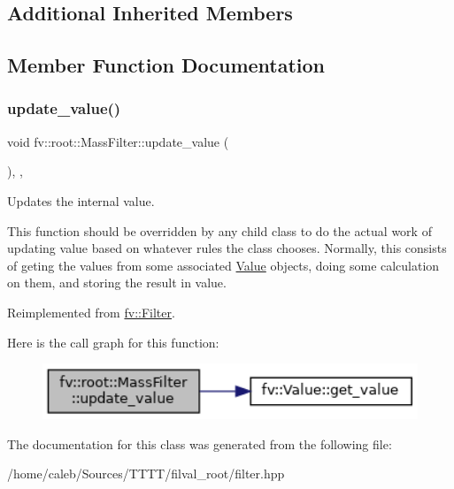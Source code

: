 \subsection*{Additional Inherited Members}


\subsection{Member Function Documentation}
\hypertarget{classfv_1_1root_1_1MassFilter_a1a8b086086e1220bc352523184d3f1c2}{}\label{classfv_1_1root_1_1MassFilter_a1a8b086086e1220bc352523184d3f1c2} 
\subsubsection{\texorpdfstring{update\+\_\+value()}{update\_value()}}
{\footnotesize\ttfamily void fv\+::root\+::\+Mass\+Filter\+::update\+\_\+value (\begin{DoxyParamCaption}{ }\end{DoxyParamCaption})\hspace{0.3cm}{\ttfamily [inline]}, {\ttfamily [private]}, {\ttfamily [virtual]}}



Updates the internal value. 

This function should be overridden by any child class to do the actual work of updating value based on whatever rules the class chooses. Normally, this consists of geting the values from some associated \hyperlink{classfv_1_1Value}{Value} objects, doing some calculation on them, and storing the result in value. 

Reimplemented from \hyperlink{classfv_1_1Filter_ab3ed620127ccb32f75bc5e78bc8a60b3}{fv\+::\+Filter}.

Here is the call graph for this function\+:
\nopagebreak
\begin{figure}[H]
\begin{center}
\leavevmode
\includegraphics[width=335pt]{classfv_1_1root_1_1MassFilter_a1a8b086086e1220bc352523184d3f1c2_cgraph}
\end{center}
\end{figure}


The documentation for this class was generated from the following file\+:\begin{DoxyCompactItemize}
\item 
/home/caleb/\+Sources/\+T\+T\+T\+T/filval\+\_\+root/filter.\+hpp\end{DoxyCompactItemize}
